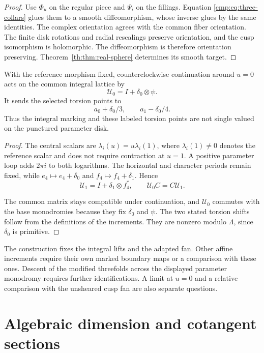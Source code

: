 \documentclass[11pt]{article}
\numberwithin{equation}{section}
\begin{document}
\begin{proof}
Use $\Phi_u$ on the regular piece and $\Psi_i$ on the fillings.
Equation \eqref{cmp:eq:three-collars} glues them to a smooth
diffeomorphism, whose inverse glues by the same identities.
The complex orientation agrees with the common fiber orientation.
The finite disk rotations and radial rescalings preserve orientation,
and the cusp isomorphism is holomorphic. The diffeomorphism is
therefore orientation preserving. Theorem~\ref{th:thm:real-sphere}
determines its smooth target.
\end{proof}

\begin{proposition}\label{cmp:prop:parameter-monodromy}
With the reference morphism fixed, counterclockwise continuation
around $u=0$ acts on the common integral lattice by
\[
 \mathcal U_0=I+\delta_0\otimes\psi.
\]
It sends the selected torsion points to
\[
 a_0+\delta_0/3,\qquad a_1-\delta_0/4.
\]
Thus the integral marking and these labeled torsion points are
not single valued on the punctured parameter disk.
\end{proposition}

\begin{proof}
The central scalars are $\lambda_i(u)=u\lambda_i(1)$, where
$\lambda_i(1)\ne0$ denotes the reference scalar and does not require
contraction at $u=1$. A positive parameter loop adds $2\pi i$ to
both logarithms. The horizontal and character periods remain fixed,
while $e_4\mapsto e_4+\delta_0$ and
$f_4\mapsto f_4+\delta_1$. Hence
\[
 \mathcal U_1=I+\delta_1\otimes f_4^*,\qquad
 \mathcal U_0C=C\mathcal U_1.
\]

The common matrix stays compatible under continuation, and
$\mathcal U_0$ commutes with the base monodromies because they fix
$\delta_0$ and $\psi$. The two stated torsion shifts follow from
the definitions of the increments. They are nonzero modulo
$\Lambda$, since $\delta_0$ is primitive.
\end{proof}

The construction fixes the integral lifts and the adapted fan.
Other affine increments require their own marked boundary maps or
a comparison with these ones. Descent of the modified threefolds
across the displayed parameter monodromy requires further
identifications. A limit at $u=0$ and a relative comparison with
the unsheared cusp fan are also separate questions.

\section{Algebraic dimension and cotangent sections}\label{sec:algebraic-dimension}
\end{document}
